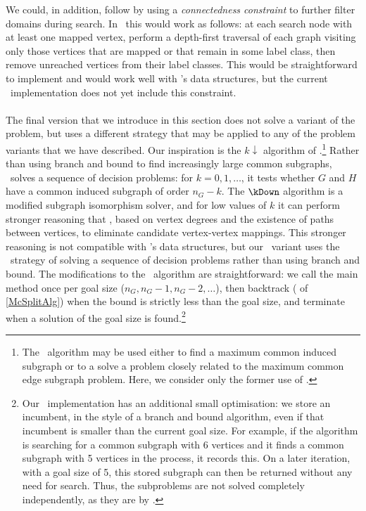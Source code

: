 We could, in addition, follow \citet{DBLP:conf/cp/NdiayeS11} by using a
\emph{connectedness constraint} to further filter domains during search.
In \McSplit\ this would work as follows: at
each search node with at least one mapped vertex, perform a depth-first
traversal of each graph visiting only those vertices that are mapped or that
remain in some label class, then remove unreached vertices from their label classes.
This would be straightforward to implement and would work well with \McSplit's
data structures, but the current \McSplit\ implementation does not yet include this
constraint.

\paragraph{\McSplitDown} The final version that we introduce in this section
does not solve a variant of the problem, but uses a different strategy
that may be applied to any of the problem variants that we have described.
Our inspiration is the $k{\downarrow}$ algorithm of
\citet{UpcomingAAAIPaper}.\footnote{The \kDown\ algorithm may be used
either to find a maximum common induced subgraph or to a solve a problem
closely related to the maximum common edge subgraph problem.  Here, we consider
only the former use of \kDown.}  Rather than using branch and bound to find
increasingly large common subgraphs, \kDown\ solves a sequence of decision problems:
for $k=0, 1, \dots$, it tests whether $G$ and $H$ have a common induced subgraph
of order $n_G-k$.  The $\kDown$ algorithm is a modified subgraph isomorphism solver,
and for low values of $k$ it can perform stronger reasoning that \McSplit,
based on vertex degrees and the existence of paths between vertices, to eliminate
candidate vertex-vertex mappings.  This stronger reasoning is not compatible
with \McSplit's data structures, but our \McSplitDown\ variant uses the \kDown\
strategy of solving a sequence of decision problems rather than using branch
and bound.
The modifications to the \McSplit\ algorithm are straightforward:
we call the main \FuncSty{McSplit} method once per goal size ($n_G, n_G-1, n_G-2,
\dots$), then backtrack (\lineref{PruneSearch} of \cref{McSplitAlg}) when the
bound is strictly less than the goal size, and terminate when a solution of the
goal size is found.\footnote{Our \McSplit\ implementation has an additional
small optimisation: we store an incumbent, in the style of a branch and bound
algorithm, even if that incumbent is smaller than the current goal size.
For example, if the algorithm is searching for a common subgraph with 6 vertices
and it finds a common subgraph with 5 vertices in the process, it records this.
On a later iteration, with a goal size of 5, this stored subgraph can then
be returned without any need for search.  Thus, the subproblems are not
solved completely independently, as they are by \kDown.}

